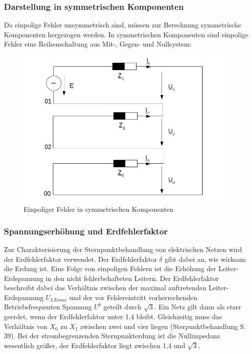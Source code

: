 \documentclass{scrartcl}
\begin{document}
\begin{onehalfspace}
\subsubsection{Darstellung in symmetrischen Komponenten}
Da einpolige Fehler unsymmetrisch sind, müssen zur Berechnung symmetrische Komponenten hergezogen werden. In symmetrischen Komponenten sind einpolige Fehler eine Reihenschaltung aus Mit-, Gegen- und Nullsystem: \\

	\begin{figure}[H]
	\centering
	\includegraphics[scale=0.6]{img/einpol-fehler.png}
	\caption{Einpoliger Fehler in symmetrischen Komponenten}
	\label{einpol-fehler}
	\end{figure}
	
\subsubsection{Spannungserhöhung und Erdfehlerfaktor}
Zur Charakterisierung der Sternpunktbehandlung von elektrischen Netzen wird der Erdfehlerfaktor verwendet. Der Erdfehlerfaktor $\delta$ gibt dabei an, wie wirksam die Erdung ist. Eine Folge von einpoligen Fehlern ist die Erhöhung der Leiter-Erdspannung in den nicht fehlerbehafteten Leitern. Der Erdfehlerfaktor beschreibt dabei das Verhältnis zwischen der maximal auftretenden Leiter-Erdspannung $U_{LEmax}$ und der vor Fehlereintritt vorherrschenden Betriebsfrequenten Spannung $U^b$ geteilt durch $\sqrt{3}$. Ein Netz gilt dann als \glqq starr geerdet\grqq, wenn der Erdfehlerfaktor unter 1,4 bleibt. Gleichzeitig muss das Verhältnis von $X_0$ zu $X_1$ zwischen zwei und vier liegen (Sterpunktbehandlung S. 39). Bei der strombegrenzenden Sternpunkterdung ist die Nullimpedanz wesentlich größer, der Erdfehlerfaktor liegt zwischen 1,4 und $\sqrt{3}$.


\end{onehalfspace}
\end{document}
